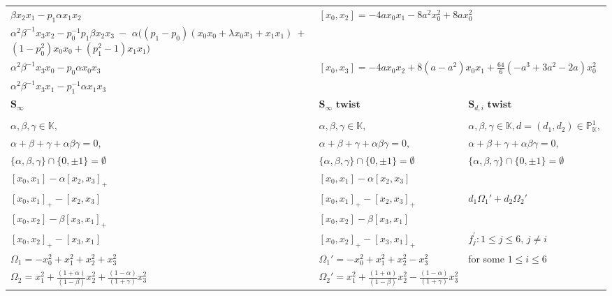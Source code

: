 \documentclass{amsart}
\begin{document}
\begin{table}[H]
{\begin{tabular}{|l|l|l|}
$\beta x_2 x_1 - p_1 \alpha x_1 x_2 $ & \\ 
 &\\
$\alpha^2\beta^{-1} x_3 x_0 - p_0 \alpha x_0 x_3$&\\ 
$\alpha^2\beta^{-1} x_3 x_1 - p_1^{-1} \alpha x_1 x_3 $& \\ 
\hline \hline
$\textbf{S}_{\infty}$ & $\textbf{S}_{\infty} \textbf{ twist}$ & $\textbf{S}_{d,i} \textbf{ twist}$ \\
\hline \hline
\cite[Equation 6.1.3]{Davies_2016,ExoticElliptic} & \cite[Equation 6.1.7]{Davies_2016,ExoticElliptic} & \cite[Equation 6.1.8]{Davies_2016,ExoticElliptic}\\ \hline
$\alpha, \beta, \gamma \in \mathbb{K},$&$\alpha, \beta, \gamma \in \mathbb{K},$&$\alpha, \beta, \gamma\in \mathbb{K}, d=(d_1, d_2) \in \mathbb{P}^1_\mathbb{K}, $\\
$\alpha + \beta + \gamma + \alpha\beta\gamma = 0,$&$\alpha + \beta + \gamma + \alpha\beta\gamma = 0,$&$\alpha + \beta + \gamma + \alpha \beta \gamma = 0,$\\
$\{\alpha, \beta, \gamma\} \cap \{0, \pm1\} = \emptyset$&$\{\alpha, \beta, \gamma\} \cap \{0, \pm1\} = \emptyset$ & $\{ \alpha, \beta, \gamma \} \cap \{ 0, \pm 1 \} = \emptyset$ \\
\hline
$[x_0, x_1]  -  \alpha[x_2, x_3]_+$& $[x_0, x_1]  -  \alpha[x_2, x_3]$ &  \\
$[x_0, x_1]_+  -  [x_2, x_3]$ & $[x_0, x_1]_+  -  [x_2, x_3]_+$ & $d_1 \Omega_1' + d_2 \Omega_2'$ \\
$[x_0, x_2]  -   \beta[x_3, x_1]_+$ & $[x_0, x_2]  -   \beta[x_3, x_1]$ & \\
$[x_0, x_2]_+  -  [x_3, x_1]$ & $[x_0, x_2]_+  -  [x_3, x_1]_+$ &$f_j^{'} : 1 \leq j \leq 6, \, j \neq i$ \\
$\Omega_1 = - x_0^2 + x_1^2 + x_2^2 + x_3^2$ & $\Omega_1 ' = - x_0^2 + x_1^2 + x_2^2 - x_3^2$ & for some $1 \le i \le 6$ \\
$\Omega_2 = x_1^2 + \frac{(1 + \alpha)}{(1 - \beta)}x_2^2 +  \frac{(1 - \alpha)}{(1 + \gamma)}x_3^2 $& $\Omega_2 ' = x_1^2 + \frac{(1 + \alpha)}{(1 - \beta)}x_2^2 -  \frac{(1 - \alpha)}{(1 + \gamma)}x_3^2$ & \\



\end{tabular}}
\end{table}
\end{document}
